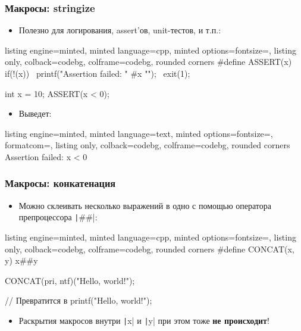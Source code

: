 \documentclass[10pt]{beamer}
\begin{document}
\begin{frame}[fragile]
\frametitle{Макросы: stringize}
\begin{itemize}
\item Полезно для логирования, assert'ов, unit-тестов, и т.п.:
\end{itemize}
\begin{tcblisting}{listing engine=minted, minted language=cpp, minted options={fontsize=\scriptsize}, listing only, colback=codebg, colframe=codebg, rounded corners}
#define ASSERT(x) if(!(x)) { \
    printf("Assertion failed: " #x "\n"); \
    exit(1); \
  }

int x = 10;
ASSERT(x < 0);
\end{tcblisting}
\begin{itemize}
\item Выведет:
\end{itemize}
\begin{tcblisting}{listing engine=minted, minted language=text, minted options={fontsize=\scriptsize, formatcom=\color{white}}, listing only, colback=codebg, colframe=codebg, rounded corners}
Assertion failed: x < 0
\end{tcblisting}
\end{frame}

\begin{frame}[fragile]
\frametitle{Макросы: конкатенация}
\begin{itemize}
\item Можно склеивать несколько выражений в одно с помощью оператора препроцессора \texttt|##|:
\end{itemize}
\usemintedstyle{lightbulb}
\begin{tcblisting}{listing engine=minted, minted language=cpp, minted options={fontsize=\scriptsize}, listing only, colback=codebg, colframe=codebg, rounded corners}
#define CONCAT(x, y) x##y

CONCAT(pri, ntf)("Hello, world!");

// Превратится в
printf("Hello, world!");
\end{tcblisting}
\pause
{}
\begin{itemize}
\item Раскрытия макросов внутри \texttt|x| и \texttt|y| при этом тоже \textbf{не происходит}!
\end{itemize}
\end{frame}
\end{document}
